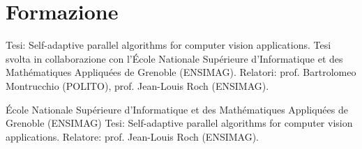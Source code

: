 \documentclass[a4paper,sans]{moderncv} %
\newcommand{\education}{Formazione}
\begin{document}



\section{\education}
	\cventry{15 aprile 2010}{Dottorato in Ingegneria Informatica e dei Sistemi}{Politecnico di Torino}{}{}{%
		Tesi: On Trusted and Privacy-Friendly Network Communications.\newline{}
		Relatore: prof. Antonio Lioy.
        }


		{}{%
		Tesi: Self-adaptive parallel algorithms for computer vision applications.%
		\newline
		Tesi svolta in collaborazione con l'\'Ecole Nationale Sup\'erieure d'Informatique et des Math\'ematiques Appliqu\'ees de Grenoble (ENSIMAG).\newline{}
		Relatori: prof. Bartrolomeo Montrucchio (POLITO), prof. Jean-Louis Roch (ENSIMAG).
        }

		{\newline \'Ecole Nationale Sup\'erieure d'Informatique et des Math\'ematiques Appliqu\'ees de Grenoble (ENSIMAG)}{}{}{%
		Tesi: Self-adaptive parallel algorithms for computer vision applications.\newline
		Relatore: prof. Jean-Louis Roch (ENSIMAG).
        }
\end{document}
